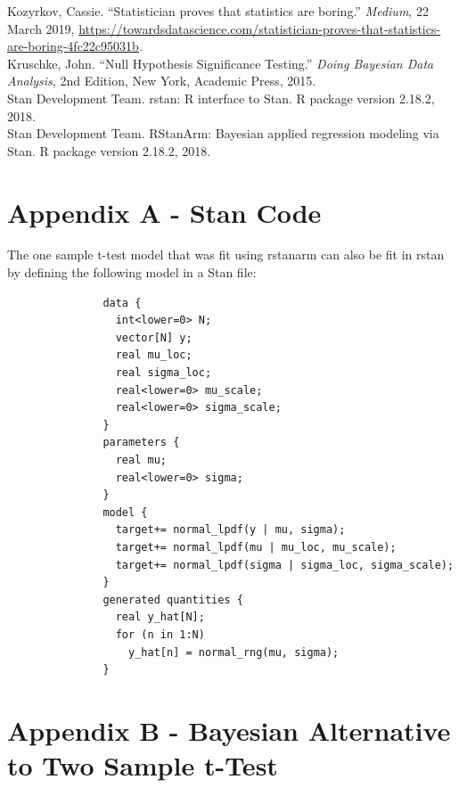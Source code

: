 \documentclass[12pt]{article}
\begin{document}
\noindent Kozyrkov, Cassie. ``Statistician proves that statistics are boring.'' \emph{Medium}, 22 March 2019, \url{https://towardsdatascience.com/statistician-proves-that-statistics-are-boring-4fc22c95031b}. \\

\noindent Kruschke, John. ``Null Hypothesis Significance Testing.'' \emph{Doing Bayesian Data Analysis}, 2nd Edition, New York, Academic Press, 2015. \\

\noindent Stan Development Team. rstan: R interface to Stan. R package version 2.18.2, 2018. \\

\noindent Stan Development Team. RStanArm: Bayesian applied regression modeling via Stan. R package version 2.18.2, 2018. \\

\pagebreak

\section{Appendix A - Stan Code}

\noindent The one sample t-test model that was fit using rstanarm can also be fit in rstan by defining the following model in a Stan file:

\begin{verbatim}
               data {
                 int<lower=0> N;
                 vector[N] y;
                 real mu_loc;
                 real sigma_loc;
                 real<lower=0> mu_scale;
                 real<lower=0> sigma_scale;
               }
               parameters {
                 real mu;
                 real<lower=0> sigma;
               }
               model {
                 target+= normal_lpdf(y | mu, sigma);
                 target+= normal_lpdf(mu | mu_loc, mu_scale);
                 target+= normal_lpdf(sigma | sigma_loc, sigma_scale);
               }
               generated quantities {
                 real y_hat[N];
                 for (n in 1:N)
                   y_hat[n] = normal_rng(mu, sigma);
               }

\end{verbatim}

\pagebreak

\section{Appendix B - Bayesian Alternative to Two Sample t-Test}
\end{document}
